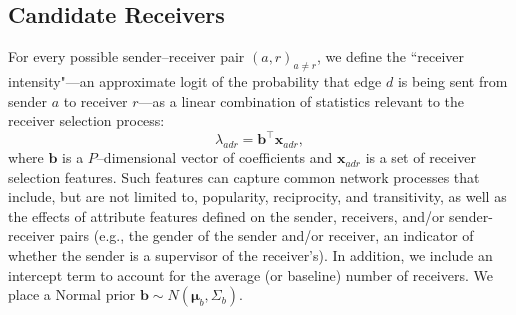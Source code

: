 \documentclass[ba]{imsart}
\numberwithin{equation}{section}
\theoremstyle{plain}
\begin{document}
\subsection{Candidate Receivers}\label{subsec: Tie}
For every possible sender--receiver pair $(a,r)_{a \neq r}$, we define the ``receiver intensity"---an approximate logit of the probability that edge $d$ is being sent from sender $a$ to receiver $r$---as a linear combination of statistics relevant to the receiver selection process:
\begin{equation}
\lambda_{adr} = {\boldsymbol{b}}^{\top}\boldsymbol{x}_{adr},
\end{equation}
where $\boldsymbol{b}$ is a $P$--dimensional vector of coefficients and $\boldsymbol{x}_{adr}$ is a set of receiver selection features. Such features can capture common network processes that include, but are not limited to, popularity, reciprocity, and transitivity, as well as the effects of attribute features defined on the sender, receivers, and/or sender-receiver pairs (e.g., the gender of the sender and/or receiver, an indicator of whether the sender is a supervisor of the receiver's). In addition, we include an intercept term to account for the average (or baseline) number of receivers. We place a Normal prior $\boldsymbol{b} \sim N(\boldsymbol{\mu}_b, \Sigma_b)$.
\end{document}
